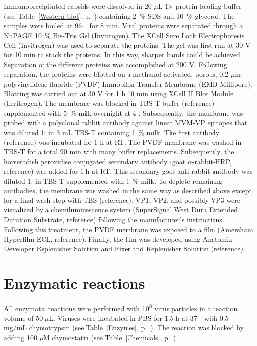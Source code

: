 Immunoprecipitated capsids were dissolved in 20 $\mu$L 1$\times$ protein loading buffer (see Table~\ref{Western blot}, p.~\pageref{Western blot}) containing 2~\% SDS and 10~\% glycerol. The samples were boiled at 96 \textcelsius~ for 8 min. Viral proteins were separated through a NuPAGE\textsuperscript{\textregistered} 10~\% Bis-Tris Gel (Invitrogen). The XCell Sure Lock\textsuperscript{\texttrademark} Electrophoresis Cell (Invitrogen) was used to separate the proteins. The gel was first run at 30 V for 10 min to stack the proteins. In this way, sharper bands could be achieved. Separation of the different proteins was accomplished at 200 V. Following separation, the proteins were blotted on a methanol activated, porous, 0.2 $\mu$m polyvinylidene fluoride (PVDF) Immobilon\textsuperscript{\textregistered} Transfer Membrane (EMD Millipore). Blotting was carried out at 30 V for 1 h 10 min using XCell II\textsuperscript{\texttrademark} Blot Module (Invitrogen). 
The membrane was blocked in TBS-T buffer (reference) supplemented with 5~\% milk overnight at 4 \textcelsius. Subsequently, the membrane was probed with a polyclonal rabbit antibody against linear MVM-VP epitopes that was diluted 1: in 3 mL TBS-T containing 1~\% milk. The first antibody (reference) was incubated for 1 h at RT. The PVDF membrane was washed in TBS-T for a total 90 min with many buffer replacements. Subsequently, the horseradish peroxidise conjugated secondary antibody (goat $\alpha$-rabbit-HRP, reference) was added for 1 h at RT. This secondary goat anti-rabbit antibody was diluted 1: in TBS-T supplemented with 1~\% milk. To deplete remaining antibodies, the membrane was washed in the same way as described above except for a final wash step with TBS (reference). VP1, VP2, and possibly VP3 were visualized by a chemiluminescence system (SuperSignal West Dura Extended Duration Substrate, reference) following the manufacturer’s instructions. Following this treatment, the PVDF membrane was exposed to a film (Amersham Hyperfilm\textsuperscript{\texttrademark} ECL, reference). Finally, the film was developed using Anatomix Developer Replenisher Solution and Fixer and Replenisher Solution (reference).

\section{Enzymatic reactions}
 
All enzymatic reactions were performed with 10\textsuperscript{8} virus particles in a reaction volume of 50 $\mu$L. Viruses were incubated in PBS for 1.5 h at 37~\textcelsius~with 0.5 mg/mL chymotrypsin (see Table~\ref{Enzymes}, p.~\pageref{Enzymes}). The reaction was blocked by adding 100 $\mu$M chymostatin (see Table~\ref{Chemicals}, p.~\pageref{Chemicals}). 

